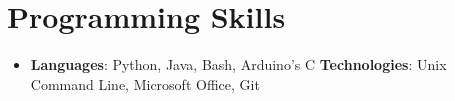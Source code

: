 \documentclass[letterpaper,11pt]{article}
\newcommand{\resumeSubHeadingListStart}{\begin{itemize}[leftmargin=*]}
\newcommand{\resumeSubHeadingListEnd}{\end{itemize}}
\begin{document}
\section{Programming Skills}
 \resumeSubHeadingListStart
   \item{
     \textbf{Languages}{: Python, Java, Bash, Arduino's C}
     \hfill
     \textbf{Technologies}{: Unix Command Line, Microsoft Office, Git}
   }
 \resumeSubHeadingListEnd

\end{document}
